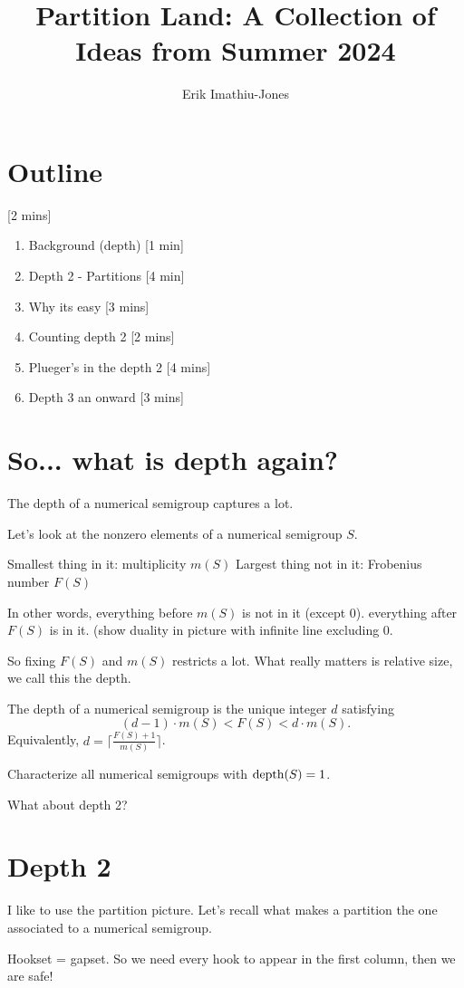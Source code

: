 \documentclass[11pt]{article}
\title{Partition Land: A Collection of Ideas from Summer 2024}
\author{Erik Imathiu-Jones}
\begin{document}

\newpage
\section{Outline}[2 mins]
\begin{enumerate}
    \item Background (depth) [1 min]
    \item Depth 2 - Partitions [4 min]
    \item Why its easy [3 mins]
    \item Counting depth 2 [2 mins]
    \item Plueger's in the depth 2 [4 mins]
    \item Depth 3 an onward [3 mins]
\end{enumerate}

\section{So... what is depth again?}
\begin{tcolorbox}[title=TLDR]
    The depth of a numerical semigroup captures a lot.
\end{tcolorbox}

Let's look at the nonzero elements of a numerical semigroup \(S\).

Smallest thing in it: multiplicity \(m(S)\)
Largest thing not in it: Frobenius number \(F(S)\)

In other words, everything before \(m(S)\) is not in it (except 0).
everything after \(F(S)\) is in it. (show duality in picture with infinite line excluding 0.

So fixing \(F(S)\) and \(m(S)\) restricts a lot. What really matters is relative size, we call this the depth.

\begin{definition}
    The depth of a numerical semigroup is the unique integer \(d\) satisfying \[(d - 1) \cdot m(S) < F(S) < d \cdot m(S).\] Equivalently, \(d = \lceil \frac{F(S) + 1}{m(S)} \rceil\).
\end{definition}

\begin{tcolorbox}[title=Trivia!]
    Characterize all numerical semigroups with \(\text{depth}(S) = 1\).
\end{tcolorbox}

What about depth 2?

\section{Depth 2}

I like to use the partition picture. Let's recall what makes a partition the one associated to a numerical semigroup.

Hookset = gapset. So we need every hook to appear in the first column, then we are safe!
\end{document}
